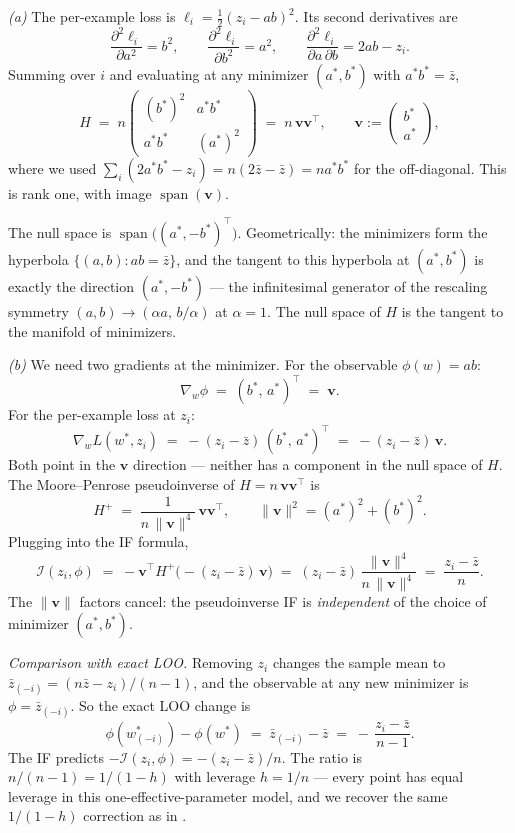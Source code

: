 \begin{solution}[ex:if-degenerate]

\textit{(a)} The per-example loss is $\ell_i = \tfrac12(z_i - ab)^2$. Its second derivatives are
\[
  \frac{\partial^2 \ell_i}{\partial a^2} = b^2,
  \qquad
  \frac{\partial^2 \ell_i}{\partial b^2} = a^2,
  \qquad
  \frac{\partial^2 \ell_i}{\partial a\,\partial b} = 2ab - z_i.
\]
Summing over $i$ and evaluating at any minimizer $(a^*,b^*)$ with $a^*b^* = \bar z$,
\[
  H \;=\; n\begin{pmatrix} (b^*)^2 & a^*b^* \\ a^*b^* & (a^*)^2 \end{pmatrix}
  \;=\; n\,\mathbf{v}\mathbf{v}^\top,
  \qquad \mathbf{v} := \begin{pmatrix}b^*\\a^*\end{pmatrix},
\]
where we used $\sum_i(2a^*b^* - z_i) = n(2\bar z - \bar z) = na^*b^*$ for the off-diagonal. This is rank one, with image $\operatorname{span}(\mathbf{v})$.

The null space is $\operatorname{span}\bigl((a^*,-b^*)^\top\bigr)$. Geometrically: the minimizers form the hyperbola $\{(a,b): ab = \bar z\}$, and the tangent to this hyperbola at $(a^*,b^*)$ is exactly the direction $(a^*,-b^*)$ --- the infinitesimal generator of the rescaling symmetry $(a,b)\to(\alpha a,\, b/\alpha)$ at $\alpha=1$. The null space of $H$ is the tangent to the manifold of minimizers.

\textit{(b)} We need two gradients at the minimizer. For the observable $\phi(w) = ab$:
\[
  \nabla_w\phi \;=\; (b^*,\,a^*)^\top \;=\; \mathbf{v}.
\]
For the per-example loss at $z_i$:
\[
  \nabla_w L(w^*,z_i) \;=\; -(z_i - \bar z)\,(b^*,\,a^*)^\top \;=\; -(z_i - \bar z)\,\mathbf{v}.
\]
Both point in the $\mathbf{v}$ direction --- neither has a component in the null space of $H$. The Moore--Penrose pseudoinverse of $H = n\,\mathbf{v}\mathbf{v}^\top$ is
\[
  H^+ \;=\; \frac{1}{n\,\|\mathbf{v}\|^4}\,\mathbf{v}\mathbf{v}^\top,
  \qquad \|\mathbf{v}\|^2 = (a^*)^2 + (b^*)^2.
\]
Plugging into the IF formula,
\[
  \mathcal{I}(z_i,\phi)
  \;=\; -\mathbf{v}^\top H^+\bigl(-(z_i-\bar z)\,\mathbf{v}\bigr)
  \;=\; (z_i - \bar z)\,\frac{\|\mathbf{v}\|^4}{n\,\|\mathbf{v}\|^4}
  \;=\; \frac{z_i - \bar z}{n}.
\]
The $\|\mathbf{v}\|$ factors cancel: the pseudoinverse IF is \emph{independent} of the choice of minimizer $(a^*,b^*)$.

\emph{Comparison with exact LOO.} Removing $z_i$ changes the sample mean to $\bar z_{(-i)} = (n\bar z - z_i)/(n-1)$, and the observable at any new minimizer is $\phi = \bar z_{(-i)}$. So the exact LOO change is
\[
  \phi(w^*_{(-i)}) - \phi(w^*) \;=\; \bar z_{(-i)} - \bar z \;=\; -\,\frac{z_i - \bar z}{n-1}.
\]
The IF predicts $-\mathcal{I}(z_i,\phi) = -(z_i-\bar z)/n$. The ratio is $n/(n-1) = 1/(1-h)$ with leverage $h = 1/n$ --- every point has equal leverage in this one-effective-parameter model, and we recover the same $1/(1-h)$ correction as in .


\end{solution}
